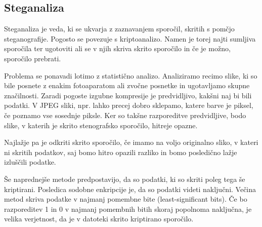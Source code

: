 \subsection{Steganaliza}
    Steganaliza je veda, ki se ukvarja z zaznavanjem sporočil, skritih s pomčjo steganografije. Pogosto se povezuje s kriptoanalizo. Namen je torej najti sumljiva sporočila ter ugotoviti ali se v njih skriva skrito sporočilo in če je možno, sporočilo prebrati.

    Problema se ponavadi lotimo z statistično analizo. Analiziramo recimo slike, ki so bile posnete z enakim fotoaparatom ali zvočne posnetke in ugotavljamo skupne značilnosti. Zaradi pogoste izgubne kompresije je predvidljivo, kakšni naj bi bili podatki. V JPEG sliki, npr. lahko precej dobro sklepamo, katere barve je piksel, če poznamo vse sosednje piksle. Ker so takšne razporeditve predvidljive, bodo slike, v katerih je skrito stenografsko sporočilo, hitreje opazne.

    Najlažje pa je odkriti skrito sporočilo, če imamo na voljo originalno sliko, v kateri ni skritih podatkov, saj bomo hitro opazili razliko in bomo posledično lažje izluščili podatke.

    Še naprednejše metode predpostavijo, da so podatki, ki so skriti poleg tega še kriptirani. Posledica sodobne enkripcije je, da so podatki videti naključni. Večina metod skriva podatke v najmanj pomembne bite (least-significant bits). Če bo razporeditev 1 in 0 v najmanj pomembnih bitih skoraj popolnoma naključna, je velika verjetnost, da je v datoteki skrito kriptirano sporočilo.
